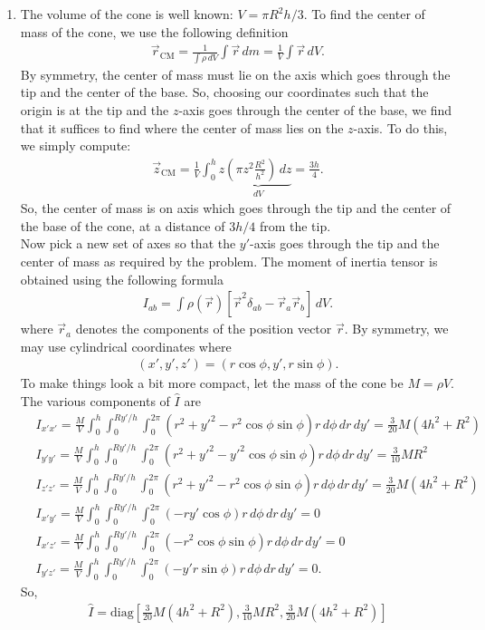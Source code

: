 \documentclass{article}
\theoremstyle{definition}
\newcommand{\f}[2]{\frac{#1}{#2}}
\newcommand{\lp}{\left(}
\newcommand{\rp}{\right)}
\newcommand{\lb}{\left[}
\newcommand{\rb}{\right]}
\begin{document}
\begin{enumerate}[label=(\alph*)]
	\item The volume of the cone is well known: $V = \pi R^2 h/3$. To find the center of mass of the cone, we use the following definition
	\begin{align*}
	\vec{r}_\text{CM} = \f{1}{\int \rho \, dV} \int \vec{r} \,dm = \f{1}{V}\int \vec{r} \,dV.  
	\end{align*}
	By symmetry, the center of mass must lie on the axis which goes through the tip and the center of the base. So, choosing our coordinates such that the origin is at the tip and the $z$-axis goes through the center of the base, we find that it suffices to find where the center of mass lies on the $z$-axis. To do this, we simply compute:
	\begin{align*}
	\vec{z}_\text{CM} =\f{1}{V} \int_{0}^h z\underbrace{\lp \pi z^2 \f{R^2}{h^2} \rp \,dz}_{dV} = \f{3h}{4}.
	\end{align*}
	So, the center of mass is on axis which goes through the tip and the center of the base of the cone, at a distance of $3h/4$ from the tip. \\
	
	Now pick a new set of axes so that the $y'$-axis goes through the tip and the center of mass as required by the problem. The moment of inertia tensor is obtained using the following formula
	\begin{align*}
	I_{ab} = \int \rho(\vec{r}) \lb \vec{r}^2 \delta_{ab} - \vec{r}_a \vec{r}_b \rb \,dV.
	\end{align*}
	where $\vec{r}_a$ denotes the components of the position vector $\vec{r}$. By symmetry, we may use cylindrical coordinates where
	\begin{align*}
	(x',y',z') = (r\cos\phi, y', r\sin\phi).
	\end{align*}
	To make things look a bit more compact, let the mass of the cone be $M = \rho V$. The various components of $\hat{I}$ are
	\begin{align*}
	&I_{x'x'} = \f{M}{V} \int_{0}^h \int_{0}^{Ry'/h} \int_{0}^{2\pi} (r^2 + y'^2 - r^2 \cos\phi \sin\phi )r\,d\phi\,dr\,dy' = \f{3}{20}M(4h^2 + R^2)\\
	&I_{y'y'} = \f{M}{V} \int_{0}^h \int_{0}^{Ry'/h} \int_{0}^{2\pi} (r^2 + y'^2 - y'^2 \cos\phi \sin\phi )r\,d\phi\,dr\,dy' = \f{3}{10}MR^2\\
	&I_{z'z'} = \f{M}{V} \int_{0}^h \int_{0}^{Ry'/h} \int_{0}^{2\pi} (r^2 + y'^2 - r^2 \cos\phi \sin\phi )r\,d\phi\,dr\,dy' = \f{3}{20}M(4h^2 + R^2)\\
	&I_{x'y'} = \f{M}{V} \int_{0}^h \int_{0}^{Ry'/h} \int_{0}^{2\pi} ( - r y' \cos\phi  )r\,d\phi\,dr\,dy' = 0 \\
	&I_{x'z'} = \f{M}{V} \int_{0}^h \int_{0}^{Ry'/h} \int_{0}^{2\pi} ( - r^2\cos\phi\sin\phi  )r\,d\phi\,dr\,dy' = 0 \\
	&I_{y'z'} = \f{M}{V} \int_{0}^h \int_{0}^{Ry'/h} \int_{0}^{2\pi} ( - y'r\sin\phi  )r\,d\phi\,dr\,dy' = 0.
	\end{align*}
	So, 
	\begin{align*}
	\boxed{\hat I = \text{diag}\lb \f{3}{20}M(4h^2 + R^2), \f{3}{10}MR^2,  \f{3}{20}M(4h^2 + R^2)\rb}
	\end{align*}
	

\end{enumerate}
\end{document}

